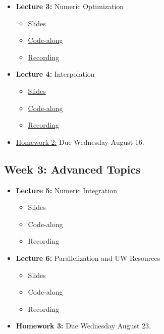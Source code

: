 \documentclass[
]{book}
\providecommand{\tightlist}{%
  \setlength{\itemsep}{0pt}\setlength{\parskip}{0pt}}
\begin{document}
\begin{itemize}
\tightlist
\item
  \textbf{Lecture 3:} Numeric Optimization

  \begin{itemize}
  \tightlist
  \item
    \href{https://kevinghunt.github.io/ComputationCamp/lectures/Lecture3.html}{Slides}
  \item
    \href{https://kevinghunt.github.io/ComputationCamp/codealongs/CodeAlong3.jl}{Code-along}
  \item
    \href{https://uwmadison.zoom.us/rec/share/xD1LsrLsUF8XtJUjPTVDA_2d52EKgQTF1a6Dc3lBOSB7JlRk4PMUi_h0oMRnMtb5.VW6mJ7BkoiC6riUk}{Recording}
  \end{itemize}
\item
  \textbf{Lecture 4:} Interpolation

  \begin{itemize}
  \tightlist
  \item
    \href{https://kevinghunt.github.io/ComputationCamp/lectures/Lecture4.html}{Slides}
  \item
    \href{https://kevinghunt.github.io/ComputationCamp/codealongs/CodeAlong4.jl}{Code-along}
  \item
    \href{https://uwmadison.zoom.us/rec/share/YNnLYBVpnTSQsMTHQGDDWx2n89gURdYXzVWM8dRyV4o91bAfmCkC8q1IT3f-jo3B.msXmwKB-ZcXcIZRL}{Recording}
  \end{itemize}
\item
  \href{https://kevinghunt.github.io/ComputationCamp/homeworks/homework2.html}{Homework 2:} Due Wednesday August 16.
\end{itemize}

\hypertarget{week-3-advanced-topics}{%
\subsection{Week 3: Advanced Topics}\label{week-3-advanced-topics}}

\begin{itemize}
\tightlist
\item
  \textbf{Lecture 5:} Numeric Integration

  \begin{itemize}
  \tightlist
  \item
    Slides
  \item
    Code-along
  \item
    Recording
  \end{itemize}
\item
  \textbf{Lecture 6:} Parallelization and UW Resources

  \begin{itemize}
  \tightlist
  \item
    Slides
  \item
    Code-along
  \item
    Recording
  \end{itemize}
\item
  \textbf{Homework 3:} Due Wednesday August 23.
\end{itemize}
\end{document}

